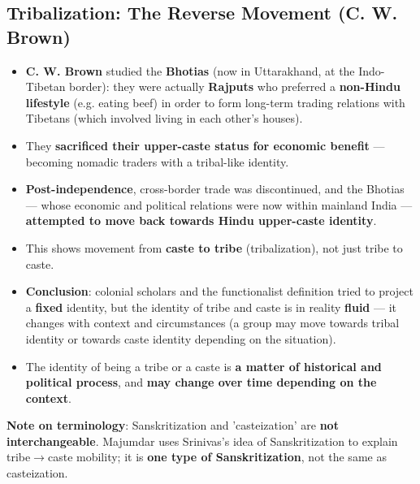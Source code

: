 \subsection{Tribalization: The Reverse Movement (C. W. Brown)}

\begin{ExampleBox}
\begin{itemize}
\item \textbf{C. W. Brown} studied the \textbf{Bhotias} (now in Uttarakhand, at the Indo-Tibetan border): they were actually \textbf{Rajputs} who preferred a \textbf{non-Hindu lifestyle} (e.g. eating beef) in order to form long-term trading relations with Tibetans (which involved living in each other's houses).
\item They \textbf{sacrificed their upper-caste status for economic benefit} --- becoming nomadic traders with a tribal-like identity.
\item \textbf{Post-independence}, cross-border trade was discontinued, and the Bhotias --- whose economic and political relations were now within mainland India --- \textbf{attempted to move back towards Hindu upper-caste identity}.
\item This shows movement from \textbf{caste to tribe} (tribalization), not just tribe to caste.
\end{itemize}
\end{ExampleBox}

\begin{KeyConcept}
\begin{itemize}
\item \textbf{Conclusion}: colonial scholars and the functionalist definition tried to project a \textbf{fixed} identity, but the identity of tribe and caste is in reality \textbf{fluid} --- it changes with context and circumstances (a group may move towards tribal identity or towards caste identity depending on the situation).
\item The identity of being a tribe or a caste is \textbf{a matter of historical and political process}, and \textbf{may change over time depending on the context}.
\end{itemize}
\end{KeyConcept}

\begin{CriticalPoint}
\textbf{Note on terminology}: Sanskritization and 'casteization' are \textbf{not interchangeable}. Majumdar uses Srinivas's idea of Sanskritization to explain tribe$\rightarrow$caste mobility; it is \textbf{one type of Sanskritization}, not the same as casteization.
\end{CriticalPoint}

